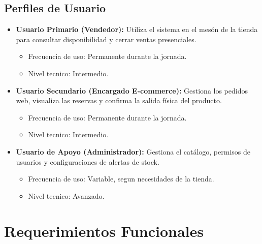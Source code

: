 \documentclass[12pt,a4paper]{article}
\begin{document}
\subsection{Perfiles de Usuario}
\begin{itemize}
    \item \textbf{Usuario Primario (Vendedor):} Utiliza el sistema en el mesón de la tienda para consultar disponibilidad y cerrar ventas presenciales.
    \begin{itemize}
        \item Frecuencia de uso: Permanente durante la jornada.
        \item Nivel tecnico: Intermedio.
    \end{itemize}
    \item \textbf{Usuario Secundario (Encargado E-commerce):} Gestiona los pedidos web, visualiza las reservas y confirma la salida física del producto.
    \begin{itemize}
        \item Frecuencia de uso: Permanente durante la jornada.
        \item Nivel tecnico: Intermedio.
    \end{itemize}
    \item \textbf{Usuario de Apoyo (Administrador):} Gestiona el catálogo, permisos de usuarios y configuraciones de alertas de stock.
    \begin{itemize}
        \item Frecuencia de uso: Variable, segun necesidades de la tienda.
        \item Nivel tecnico: Avanzado.
    \end{itemize}
\end{itemize}

\section{Requerimientos Funcionales}
\end{document}
